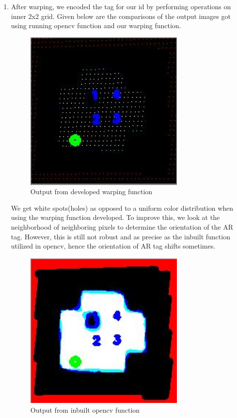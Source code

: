 \documentclass[12pt]{article}
\begin{document}
\begin{enumerate}
\item After warping, we encoded the tag for our id by performing operations on inner 2x2 grid. Given below are the comparisons of the output images got using running opencv function and our warping function.
\begin{figure}[h]
    \centering
    \includegraphics[width=8cm]{warping_coded}
    \caption{Output from developed warping function}
    \label{fig:warping_coded}
\end{figure}
We get white spots(holes) as opposed to a uniform color distribution when using the warping function developed. To improve this,
we look at the neighborhood of neighboring pixels to determine the orientation of the AR tag. However, this is still not robust and as precise as the inbuilt function utilized in opencv, hence the orientation of AR tag shifts sometimes.
\begin{figure}[h]
    \centering
    \includegraphics[width=8cm]{warping_opencv}
    \caption{Output from inbuilt opencv function}
    \label{fig:warping_coded}
\end{figure}

\end{enumerate}
\end{document}
